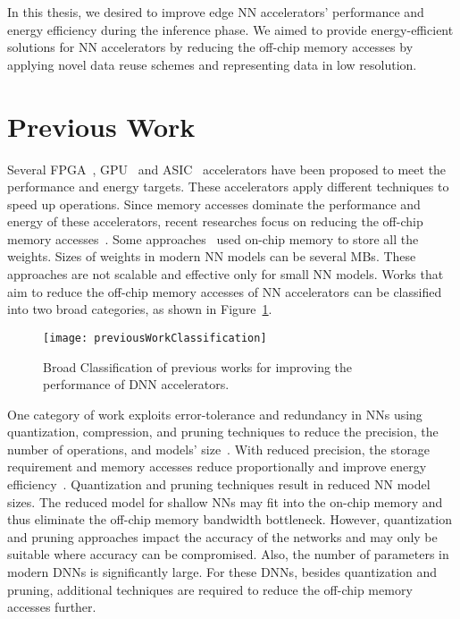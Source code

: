 In this thesis, we desired to improve edge NN accelerators' performance and energy efficiency during the inference phase. We aimed to provide energy-efficient solutions for NN accelerators by reducing the off-chip memory accesses by applying novel data reuse schemes and representing data in low resolution.

\section{Previous Work}
Several FPGA~\cite{zhang2015optimizing,wei2019overcoming,gokhale2014240,8742284,gupta2015deep,alwani2016fused}, GPU~\cite{chetlur2014cudnn} and ASIC~\cite{Chen2016EyerissAS,chen2014diannao,chen2014dadiannao,du2015shidiannao} accelerators have been proposed to meet the performance and energy targets. These accelerators apply different techniques to speed up operations. Since memory accesses dominate the performance and energy of these accelerators, recent researches focus on reducing the off-chip memory accesses~\cite{chen2014diannao,chen2016eyeriss,zhang2015optimizing}. Some approaches~\cite{lee2016fpga, rybalkin2018finn, ferreira2016fpga} used on-chip memory to store all the weights. Sizes of weights in modern NN models can be several MBs. These approaches are not scalable and effective only for small NN models. 
Works that aim to reduce the off-chip memory accesses of NN accelerators can be classified into two broad categories, as shown in Figure~\ref{fig:previousWorkClassification}. 
\begin{figure}[!htb]
	\centering
	\captionsetup{font=sf}
	\texttt{[image: previousWorkClassification]}
	\caption{Broad Classification of previous works for improving the performance of DNN accelerators.}
	\label{fig:previousWorkClassification}
\end{figure}

One category of work exploits error-tolerance and redundancy in NNs using quantization, compression, and pruning techniques to reduce the precision, the number of operations, and models' size~\cite{ferreira2016fpga,wang2018c,chang2015recurrent,han2017ese,lee2016fpga}. With reduced precision, the storage requirement and memory accesses reduce proportionally and improve energy efficiency~\cite{sze2017efficient}. Quantization and pruning techniques result in reduced NN model sizes. The reduced model for shallow NNs may fit into the on-chip memory and thus eliminate the off-chip memory bandwidth bottleneck. However, quantization and pruning approaches impact the accuracy of the networks and may only be suitable where accuracy can be compromised. Also, the number of parameters in modern DNNs is significantly large. For these DNNs, besides quantization and pruning, additional techniques are required to reduce the off-chip memory accesses further.

